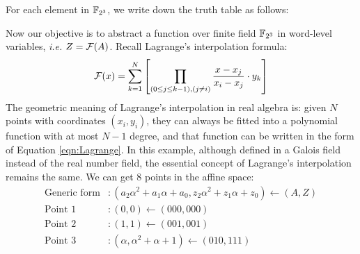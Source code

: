 \begin{Example}
For each element in $\F_{2^3}$, we write down the truth table as follows:
\begin{table}[H]
\label{tab:truthtable}
\caption{Truth table for mappings in $\mathbb{B}^3$ and $\F_{2^3}$.}
\end{table}
Now our objective is to abstract a function over finite field $\F_{2^3}$ in word-level variables, {\it i.e.} 
$Z = {\mathcal{F}}(A)$. Recall Lagrange's interpolation formula:
\begin{equation}
\label{eqn:Lagrange}
{\mathcal{F}}(x) =  \sum_{k=1}^N \left[ \prod_{(0\leq j \leq k-1),(j\neq i)}\frac{x-x_j}{x_i-x_j} \cdot y_k \right]
\end{equation}
The geometric meaning of Lagrange's interpolation in real algebra is: given $N$ points with coordinates $(x_i,y_i)$,
they can always be fitted into a polynomial function with at most $N-1$ degree, and that function can be 
written in the form of Equation \ref{eqn:Lagrange}. In this example, although defined in a Galois field instead of 
the real number field, the essential concept of Lagrange's interpolation remains the same. 
We can get 8 points in the affine space:
\begin{align*}
\text{Generic form}&: (a_2\alpha^2+a_1\alpha+a_0,z_2\alpha^2+z_1\alpha+z_0) \gets (A,Z) \\
\text{Point }1&: (0, 0) \gets (000,000) \\
\text{Point }2&: (1,1) \gets (001,001) \\
\text{Point }3&:  (\alpha,\alpha^2 + \alpha + 1) \gets (010,111)\\

\end{align*}
\end{Example}
